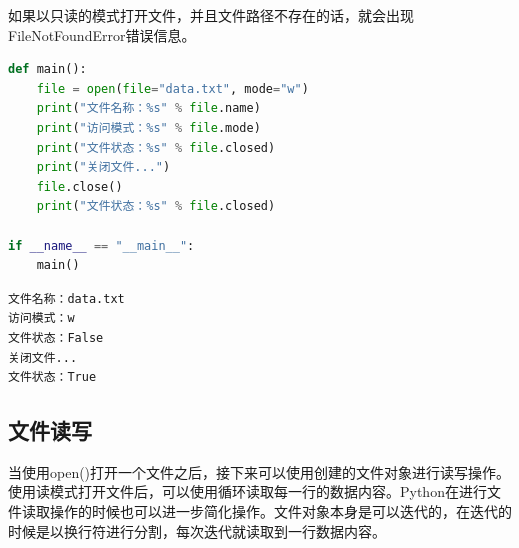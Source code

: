 如果以只读的模式打开文件，并且文件路径不存在的话，就会出现FileNotFoundError错误信息。\\


\begin{lstlisting}[language=Python]
def main():
    file = open(file="data.txt", mode="w")
    print("文件名称：%s" % file.name)
    print("访问模式：%s" % file.mode)
    print("文件状态：%s" % file.closed)
    print("关闭文件...")
    file.close()
    print("文件状态：%s" % file.closed)

if __name__ == "__main__":
    main()
\end{lstlisting}

\begin{tcolorbox}
    \begin{verbatim}
文件名称：data.txt
访问模式：w
文件状态：False
关闭文件...
文件状态：True
	\end{verbatim}
\end{tcolorbox}

\vspace{0.5cm}

\subsection{文件读写}

当使用open()打开一个文件之后，接下来可以使用创建的文件对象进行读写操作。\\

使用读模式打开文件后，可以使用循环读取每一行的数据内容。Python在进行文件读取操作的时候也可以进一步简化操作。文件对象本身是可以迭代的，在迭代的时候是以换行符进行分割，每次迭代就读取到一行数据内容。

